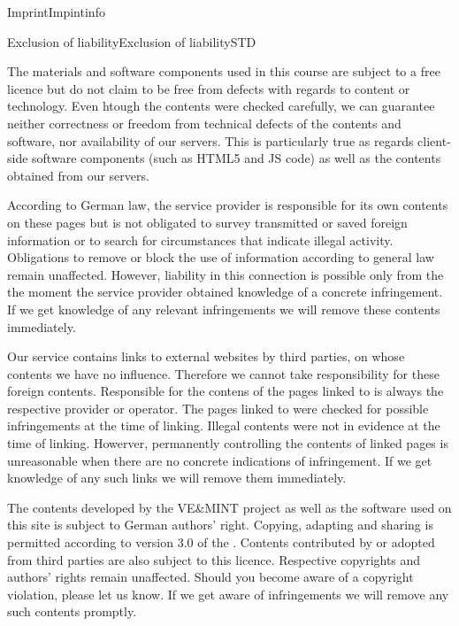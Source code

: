 \begin{MXContent}{Imprint}{Impint}{info}
\end{MXContent}

\begin{MXContent}{Exclusion of liability}{Exclusion of liability}{STD}

The materials and software components used in this course are subject to a free licence but do not claim to be free from defects with regards to content or technology.
Even htough the contents were checked carefully, we can guarantee neither correctness or freedom from technical defects of the contents and software, nor availability of our servers.
This is particularly true as regards client-side software components (such as HTML5 and JS code) as well as the contents obtained from our servers.

According to German law, the service provider is responsible for its own contents on these pages but is not obligated to survey transmitted or saved foreign information
or to search for circumstances that indicate illegal activity.
Obligations to remove or block the use of information according to general law remain unaffected.
However, liability in this connection is possible only from the the moment the service provider obtained knowledge of a concrete infringement.
If we get knowledge of any relevant infringements we will remove these contents immediately.

Our service contains links to external websites by third parties, on whose contents we have no influence.
Therefore we cannot take responsibility for these foreign contents.
Responsible for the contens of the pages linked to is always the respective provider or operator.
The pages linked to were checked for possible infringements at the time of linking. Illegal contents were not in evidence at the time of linking.
Howerver, permanently controlling the contents of linked pages is unreasonable when there are no concrete indications of infringement.
If we get knowledge of any such links we will remove them immediately.

The contents developed by the VE\&MINT project as well as the software used on this site is subject to German authors' right.
Copying, adapting and sharing is permitted according to version 3.0 of the .
Contents contributed by or adopted from third parties are also subject to this licence. Respective copyrights and authors' rights remain unaffected.
Should you become aware of a copyright violation, please let us know. If we get aware of infringements we will remove any such contents promptly.
\end{MXContent}
